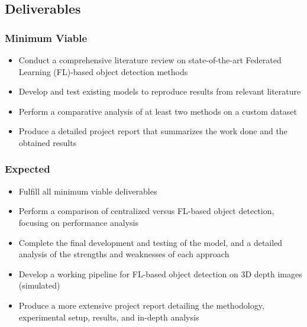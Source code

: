 \documentclass[thesis]{mas_proposal}
\begin{document}
\newpage
\subsection{Deliverables}
\subsubsection*{Minimum Viable}
\begin{itemize}
      \item Conduct a comprehensive literature review on state-of-the-art Federated Learning (FL)-based object detection methods
      \item Develop and test existing models to reproduce results from relevant literature
      \item Perform a comparative analysis of at least two methods on a custom dataset
      \item Produce a detailed project report that summarizes the work done and the obtained results

\end{itemize}

\subsubsection*{Expected}
\begin{itemize}
      \item Fulfill all minimum viable deliverables
      \item Perform a comparison of centralized versus FL-based object detection, focusing on performance analysis
      \item Complete the final development and testing of the model, and a detailed analysis of the strengths and weaknesses of each approach
      \item Develop a working pipeline for FL-based object detection on 3D depth images (simulated)
      \item Produce a more extensive project report detailing the methodology, experimental setup, results, and in-depth analysis

\end{itemize}
\end{document}
